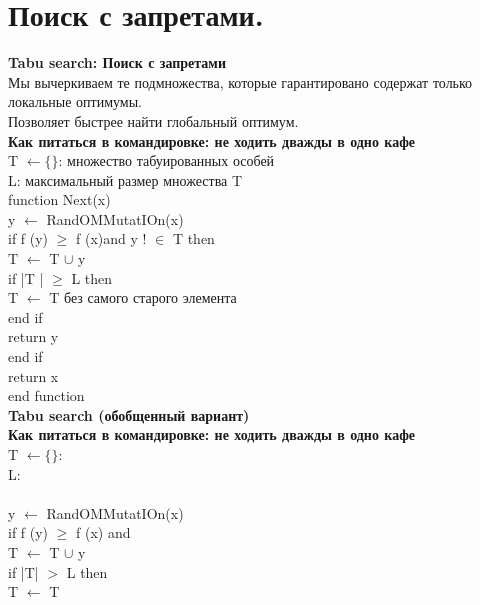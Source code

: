 \newcommand\tab[1][1cm]{\hspace*{#1}}
\section{Поиск с запретами.}
\textbf{Tabu search: Поиск с запретами}\\
Мы вычеркиваем те подмножества, которые гарантировано содержат только локальные оптимумы.\\
Позволяет быстрее найти глобальный оптимум.\\ 

\textbf{Как питаться в командировке: не ходить дважды в одно кафе}\\
T $\leftarrow \lbrace \rbrace$: множество табуированных особей  \\
L: максимальный размер множества T  \\
function Next(x)  \\
\tab y $\leftarrow$ RandOMMutatIOn(x)  \\
\tab if f (y) $\ge$ f (x)and y ! $\in$ T then  \\
\tab \tab T $\leftarrow$ T $\cup$ {y}  \\
\tab \tab if |T | $\ge$ L then  \\
\tab \tab \tab T $\leftarrow$ T без самого старого элемента  \\
\tab \tab end if  \\
\tab \tab return y  \\
\tab end if  \\
\tab return x  \\
end function \\

\textbf{Tabu search (обобщенный вариант)}\\
\textbf{Как питаться в командировке: не ходить дважды в одно кафе}\\
T $\leftarrow \lbrace \rbrace$:  \\
L:  \\
  \\
\tab y $\leftarrow$ RandOMMutatIOn(x)  \\
\tab if f (y) $\ge$ f (x) and   \\
\tab \tab T $\leftarrow$ T $\cup$ {y}  \\
\tab \tab if |T| $>$ L then  \\
\tab \tab \tab T $\leftarrow$ T   \\
\tab \tab {}  \\
\tab \tab {}  \\
\tab {}  \\
\tab {}  \\
 \\

